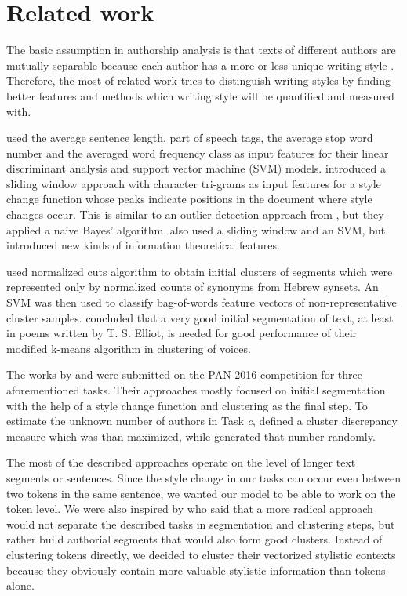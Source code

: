 \documentclass[10pt, a4paper]{article}
\begin{document}
\section{Related work}
The basic assumption in authorship analysis is that texts of different authors are mutually separable because each author has a more or less unique writing style \citep{stamatatos-2009a,ding-2016}. Therefore, the most of related work tries to distinguish writing styles by finding better features and methods which writing style will be quantified and measured with.

\citet{zu-2006} used the average sentence length, part of speech tags, the average stop word number and the averaged word frequency class as input features for their linear discriminant analysis and support vector machine (SVM) models. \citet{stamatatos-2009b} introduced a sliding window approach with character tri-grams as input features for a style change function whose peaks indicate positions in the document where style changes occur. This is similar to an outlier detection approach from \citet{stein-2011}, but they applied a naive Bayes’ algorithm. \citet{rahman-2015} also used a sliding window and an SVM, but introduced new kinds of information theoretical features.

\citet{koppel-2011} used normalized cuts algorithm to  obtain initial clusters of segments which were represented only by normalized counts of synonyms from Hebrew synsets. An SVM was then used to classify bag-of-words feature vectors of non-representative cluster samples. \citet{brooke-2013} concluded that a very good initial segmentation of text, at least in poems written by T. S. Elliot, is needed for good performance of their modified k-means algorithm in clustering of voices.

The works by \citet{kuznetsov-2016} and \citet{sittar-2016} were submitted on the PAN 2016 competition for three aforementioned tasks. Their approaches mostly focused on initial segmentation with the help of a style change function and clustering as the final step. To estimate the unknown number of authors in Task \emph{c}, \citet{kuznetsov-2016} defined a cluster discrepancy measure which was than maximized, while \citet{sittar-2016} generated that number randomly.

The most of the described approaches operate on the level of longer text segments or sentences. Since the style change in our tasks can occur even between two tokens in the same sentence, we wanted our model to be able to work on the token level. We were also inspired by \citet{brooke-2013} who said that a more radical approach would not separate the described tasks in segmentation and clustering steps, but rather build authorial segments that would also form good clusters. Instead of clustering tokens directly, we decided to cluster their vectorized stylistic contexts because they obviously contain more valuable stylistic information than tokens alone.
\end{document}

